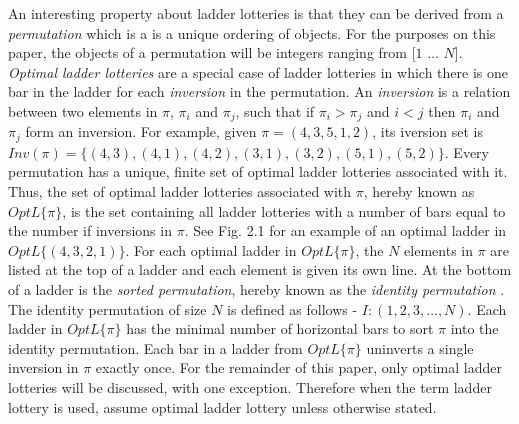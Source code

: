 An interesting property about ladder lotteries is that they can be derived from a 
\emph{permutation} which is a is a unique ordering of objects.
For the purposes on this paper, the objects of a permutation will be integers 
ranging from [$1$ $\dots$ $N$]. \emph{Optimal ladder lotteries} are a special case of ladder 
lotteries in which there is one bar in the ladder for each \emph{inversion} in the permutation.
An \emph{inversion} is a relation between two elements in $\pi$, 
$\pi_{i}$ and $\pi_{j}$, such that if $\pi_{i}>\pi_{j}$ and $i<j$ then $\pi_{i}$ and $\pi_{j}$ 
form an inversion. 
For example, given $\pi=(4,3,5,1,2)$, its iversion set is $Inv(\pi) =\{(4,3),(4,1),(4,2),(3,1),(3,2),(5,1),(5,2)\}$.
Every permutation has a unique, finite set of optimal ladder lotteries associated with it. 
 Thus, the set of optimal ladder lotteries associated with $\pi$, 
 hereby known as \emph{$OptL\{\pi\}$}, is the set containing all ladder lotteries 
 with a number of bars equal to the number if inversions in $\pi$. 
 See Fig. 2.1 for an example of an optimal ladder in $OptL\{(4,3,2,1)\}$.
 For each optimal ladder in $OptL\{\pi\}$, the $N$ 
 elements in $\pi$ are listed at the top of a ladder and each 
 element is given its own line. 
 At the bottom of a ladder is the \emph{sorted permutation}, 
 hereby known as the \emph{identity permutation} \cite{A7}. 
 The  identity permutation of size $N$ is defined as follows - $I:(1, 2, 3, \dots, N)$. 
 Each ladder in $OptL\{\pi\}$ has the minimal number of horizontal bars to sort $\pi$ 
 into the identity permutation. Each bar in a ladder from $OptL\{\pi\}$ uninverts a single 
 inversion in $\pi$ exactly once. For the remainder of this paper, only optimal ladder 
 lotteries will be discussed, with one exception. Therefore when the term ladder lottery is used, assume 
 optimal ladder lottery unless otherwise stated.\par
 
